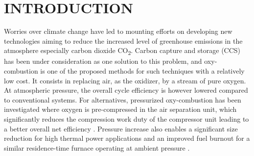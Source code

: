 \documentclass[twocolumn,10pt]{asme2e}
\begin{document}
\section*{INTRODUCTION}
Worries over climate change have led to mounting efforts on developing new technologies aiming to reduce the increased level of greenhouse emissions in the atmosphere especially carbon dioxide CO\textsubscript{2}. Carbon capture and storage (CCS) has been under consideration as one solution to this problem, and oxy-combustion is one of the proposed methods for such techniques with a relatively low cost. It consists in replacing air, as the oxidizer, by a stream of pure oxygen.
At atmospheric pressure, the overall cycle efficiency is however lowered \cite{hong2009analysis} compared to conventional systems.
For alternatives, pressurized oxy-combustion has been investigated where oxygen is pre-compressed in the air separation unit, which significantly reduces the compression work duty of the compressor unit leading to a better overall net efficiency \cite{hong2009analysis}. Pressure increase also enables a significant size reduction for high thermal power applications \cite{gopan2014process} and an improved fuel burnout for a similar residence-time furnace operating at ambient pressure \cite{gopan2014process}.
\end{document}
